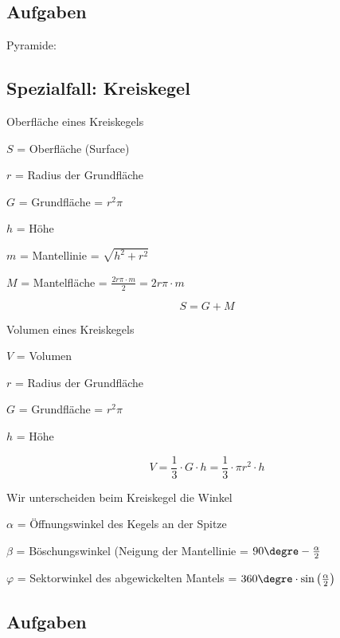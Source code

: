 \subsection*{Aufgaben}
Pyramide:
\newpage

\subsection{Spezialfall: Kreiskegel}


\begin{gesetz}{Oberfläche eines Kreiskegels}{}

  $S$ = Oberfläche (Surface)

  $r$ = Radius der Grundfläche
  
  $G$ = Grundfläche = $r^2\pi$

  $h$ = Höhe

  $m$ = Mantellinie = $\sqrt{h^2 + r^2}$
  
  $M$ = Mantelfläche = $\frac{2r\pi \cdot{} m}2 = 2r\pi\cdot{}m$

  
  $$S = G + M$$
\end{gesetz}


\begin{gesetz}{Volumen eines Kreiskegels}{}

  $V$ = Volumen

  $r$ = Radius der Grundfläche
  
  $G$ = Grundfläche = $r^2\pi$

  $h$ = Höhe

  $$V = \frac13\cdot{} G\cdot{}h = \frac13 \cdot{} \pi r^2 \cdot{} h$$
\end{gesetz}



\begin{bemerkung}{}{}
  Wir unterscheiden beim Kreiskegel die Winkel

  $\alpha$ = Öffnungswinkel des Kegels an der Spitze

  $\beta$ = Böschungswinkel (Neigung der Mantellinie = $90\degre - \frac{\alpha}{2}$

  $\varphi$ = Sektorwinkel des abgewickelten Mantels = $360\degre \cdot \sin\left(\frac{\alpha}2\right)$

\end{bemerkung}
\newpage

\subsection*{Aufgaben}


\newpage

